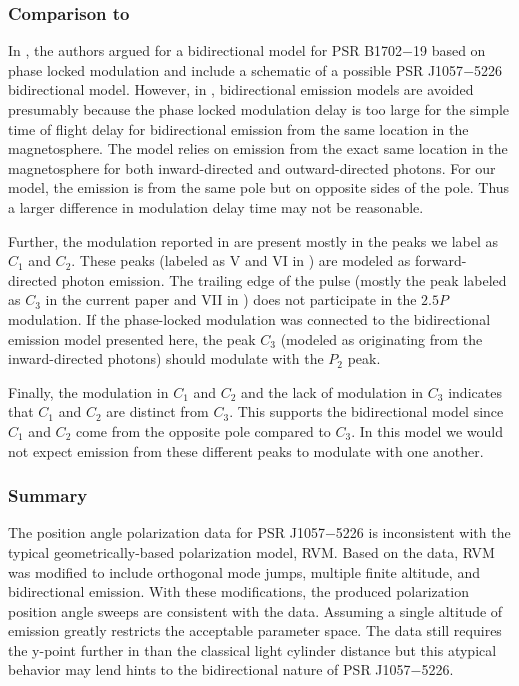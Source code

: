 \subsubsection{Comparison to \cite{weltevrede2012phase}}
\label{sec:comp2012}
In \cite{weltevrede2007main}, the authors argued for a bidirectional model
for PSR B1702$-$19 based on phase locked modulation and include a schematic 
of a possible PSR J1057$-$5226
bidirectional model.  However, in \cite{weltevrede2012phase}, bidirectional
emission models are avoided presumably because 
the phase locked modulation delay is too large
for the simple time of flight delay for bidirectional emission
from the same location in the magnetosphere.  The
model relies on emission from the exact same location in the
magnetosphere for both
inward-directed and outward-directed photons.  
For our model, the emission is from the same pole but on
opposite sides of the pole.  Thus a
larger difference in modulation delay time
may not be reasonable.

Further, the modulation reported in \cite{weltevrede2012phase} are present
mostly in the peaks we label as $C_1$ and $C_2$.  These peaks (labeled as V
and VI in \citealp{weltevrede2012phase}) are modeled as forward-directed photon
emission.  The trailing edge of the pulse (mostly the peak labeled as $C_3$
in the current paper and VII in \citealp{weltevrede2012phase}) does not
participate in the $2.5P$ modulation.  If the phase-locked modulation was
connected to the bidirectional emission model presented here, the peak
$C_3$ (modeled as originating from the inward-directed photons) should
modulate with the $P_2$ peak.

Finally, the modulation in $C_1$ and $C_2$ and the lack of modulation in $C_3$
indicates that $C_1$ and $C_2$ are distinct from $C_3$.  This supports the
bidirectional model since $C_1$ and $C_2$ come from the opposite pole compared
to $C_3$.  In this model we would not expect emission from these different
peaks to modulate with one another.


\subsubsection{Summary}
The position angle polarization data for PSR J1057$-$5226 is inconsistent with
the typical geometrically-based polarization model, RVM.  Based
on the data, RVM was modified to include orthogonal mode
jumps, multiple finite altitude, and bidirectional emission.
With these modifications, the produced
polarization position angle sweeps are consistent with the data.  
Assuming a single altitude of emission greatly
restricts the acceptable parameter space. 
The data still requires the
y-point further in than the classical
light cylinder distance but this atypical behavior may 
lend hints to the bidirectional nature of PSR J1057$-$5226.


